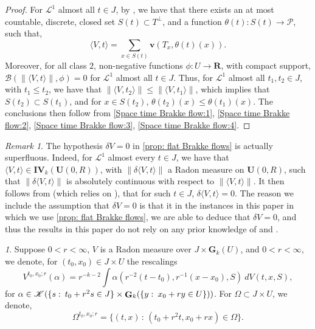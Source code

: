\documentclass{article}
\theoremstyle{plain}
\theoremstyle{definition}
\theoremstyle{plain}
\theoremstyle{remark}
\newtheorem{defparagraph}[theorem]{}
\theoremstyle{remark}
\newtheorem{remark}[theorem]{Remark}
\theoremstyle{plain}
\DeclareMathOperator{\G}{{\bf G}}
\begin{document}
\begin{proof}
    For $\mathscr{L}^{1}$ almost all $t \in J$, by \cite[3.1]{Menne2010}, we have that there exists an at most countable, discrete, closed set $S (t) \subset T^{\perp}$, and a function $\theta (t) \colon S (t) \rightarrow \mathscr{P}$, such that, 
    \begin{equation*}
        \langle V ,t \rangle = \sum_{x \in S (t)} \mathbf{v} (T_{x}, \theta (t) (x)). 
    \end{equation*}
    Moreover, for all class $2$, non-negative functions $\phi \colon U \rightarrow \mathbf{R}$, with compact support, $\mathscr{B} (\| \langle V, t \rangle \|, \phi) = 0$ for $\mathscr{L}^{1}$ almost all $t \in J$.
    Thus, for $\mathscr{L}^{1}$ almost all $t_{1}, t_{2} \in J$, with $t_{1} \leq t_{2}$, we have that $\| \langle V, t_{2} \rangle \| \leq \| \langle V, t_{1} \rangle \|$, which implies that $S (t_{2}) \subset S (t_{1})$, and for $x \in S (t_{2})$, $\theta (t_{2}) (x) \leq \theta (t_{1}) (x)$. 
    The conclusions then follow from \ref{Space time Brakke flow:1}, \ref{Space time Brakke flow:2}, \ref{Space time Brakke flow:3}, \ref{Space time Brakke flow:4}.
\end{proof}

\begin{remark}
    The hypothesis $\delta V = 0$ in \ref{prop: flat Brakke flows} is actually superfluous. 
    Indeed, for $\mathscr{L}^{1}$ almost every $t \in J$, we have that $\langle V , t \rangle \in \mathbf{IV}_{k} (\mathbf{U} (0, R))$, with $\| \delta \langle V, t \rangle \|$ a Radon measure on $\mathbf{U} (0, R)$, such that $\| \delta \langle V, t \rangle \|$  is absolutely continuous with respect to $\| \langle V, t \rangle \|$.
    It then follows from \cite[8.3, 15.6]{Menne-WDFV} (which relies on \cite[Theorem 1]{MR3023856}), that for such $t \in J$, $\delta \langle V, t \rangle = 0$.
    The reason we include the assumption that $\delta V = 0$ is that it in the instances in this paper in which we use \ref{prop: flat Brakke flows}, we are able to deduce that $\delta V = 0$, and thus the results in this paper do not rely on any prior knowledge of \cite{MR3023856} and \cite{Menne-WDFV}.
\end{remark}

\begin{defparagraph}
    Suppose $0<r<\infty$, $V$ is a  Radon measure over $J \times \mathbf{G}_{k} (U)$, and $0<r<\infty$, we denote, for $(t_{0}, x_{0}) \in J \times U$ the rescalings
    \begin{equation*}
        V^{t_0,x_0;r}(\alpha) = \textstyle r^{-k-2}\int \alpha(r^{-2}(t-t_0),r^{-1}(x-x_0),S) \ d V(t,x,S),
    \end{equation*}
    for $\alpha \in \mathscr K(\{ s \, \colon \, t_{0} + r^{2} s \in J \} \times \G_k(\{ y \, \colon \, x_{0} + r y \in U\}))$.
    For $\Omega \subset J \times U$, we denote, 
    \begin{equation*}
        \textstyle \Omega^{t_{0}, x_{0}; r} = \{ (t, x) \, \colon \, (t_{0} + r^{2} t, x_{0} + r x) \in \Omega \}.
    \end{equation*}
\end{defparagraph}
\end{document}
